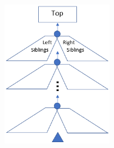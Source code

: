 \begin{frame}
\begin{columns}
\begin{column}{0.75\textwidth}
\begin{figure}
\centering
\includegraphics[width=0.6\textwidth]{figure/zipper}
\end{figure}
\end{column}
\begin{column}{0.3\textwidth}
\begin{figure}
\centering

\end{figure}
\end{column}
\end{columns}
\end{frame}
